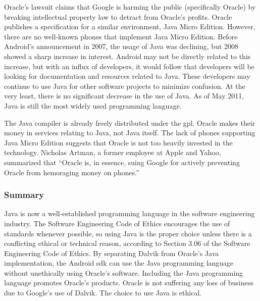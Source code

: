 \documentclass[11pt]{article}
\begin{document}
\begin{multicols}{2}
Oracle's lawsuit claims that Google is harming the public (specifically Oracle)
by breaking intellectual property law to detract from Oracle's profits.
\cite[Count VIII]{oracle-lawsuit} Oracle publishes a specification for a similar
environment, Java Micro Edition. \cite{java-me}  However, there are no
well-known phones that implement Java Micro Edition.  Before Android's
announcement in 2007, the usage of Java was declining, but 2008 showed a sharp
increase in interest.  \cite{tiobe-java}  Android may not be directly related to
this increase, but with an influx of developers, it would follow that developers
will be looking for documentation and resources related to Java.  These
developers may continue to use Java for other software projects to minimize
confusion.  At the very least, there is no significant decrease in the use of
Java.  As of May 2011, Java is still the most widely used programming language.
\cite{tiobe-java}

The Java compiler is already freely distributed under the \gls{gpl}.
\cite{openjdk-license}  Oracle makes their money in services relating to Java,
not Java itself.  The lack of phones supporting Java Micro Edition suggests that
Oracle is not too heavily invested in the technology.  Nicholas Artman, a former
employee at Apple and Yahoo, summarized that ``Oracle is, in essence, suing
Google for actively preventing Oracle from hemoraging money on phones.''
\cite{artman}


\subsubsection{Summary} %
\label{ssub:java-summary}

Java is now a well-established programming language in the software engineering
industry.  The Software Engineering Code of Ethics encourages the use of
standards whenever possible, so using Java is the proper choice unless there is
a conflicting ethical or technical reason, according to Section 3.06 of the
Software Engineering Code of Ethics. \cite[\S3.06]{secode}  By separating Dalvik
from Oracle's Java implementation, the Android \gls{sdk} can use the Java
programming language without unethically using Oracle's software.  Including the
Java programming language promotes Oracle's products.  Oracle is not suffering
any loss of business due to Google's use of Dalvik.  The choice to use Java is
ethical.



\end{multicols}
\end{document}
